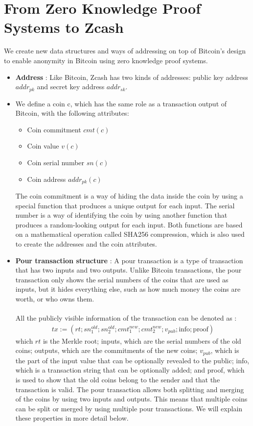 \documentclass{report}
\begin{document}
\section{From Zero Knowledge Proof Systems to Zcash}
We create new data structures and ways of addressing on top of Bitcoin’s design to enable anonymity in Bitcoin using zero knowledge proof systems.
\begin{itemize}
	\item \textbf{Address} :  Like Bitcoin, Zcash has two kinds of addresses: public key address $addr_{pk}$ and secret key address $addr_{sk}$.
	\item We define a coin c, which has the same role as a transaction output of Bitcoin, with the following attributes:
	\begin{itemize}
		\item Coin commitment $cmt(c)$
		\item Coin value $v(c)$
		\item Coin serial number $sn(c)$
		\item Coin address $addr_{pk}(c)$
	\end{itemize}
	The coin commitment is a way of hiding the data inside the coin by using a special function that produces a unique output for each input. The serial number is a way of identifying the coin by using another function that produces a random-looking output for each input. Both functions are based on a mathematical operation called SHA256 compression, which is also used to create the addresses and the coin attributes.
	
	\item \textbf{Pour transaction structure} : A pour transaction is a type of transaction that has two inputs and two outputs. Unlike Bitcoin transactions, the pour transaction only shows the serial numbers of the coins that are used as inputs, but it hides everything else, such as how much money the coins are worth, or who owns them.\\\\
	All the	publicly visible information of the transaction can be denoted as : 
	\begin{align*}
		tx := (rt; sn_1^{old}; sn_2^{old}; cmt_1^{new}; cmt_2^{new}; v_{pub}; \text{info}; \text{proof})
	\end{align*}
	which $rt$ is the Merkle root; inputs, which are the serial numbers of the old coins; outputs, which are the commitments of the new coins; $v_{pub}$, which is the part of the input value that can be optionally revealed to the public; info, which is a transaction string that can be optionally added; and proof, which is used to show that the old coins belong to the sender and that the transaction is valid. The pour transaction allows both splitting and merging of the coins by using two inputs and outputs. This means that multiple coins can be split or merged by using multiple pour transactions. We will explain these properties in more detail below.
\end{itemize}
\end{document}
